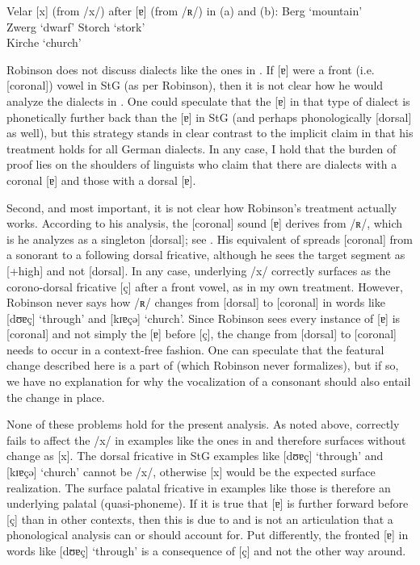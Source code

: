 \ea%
\label{ex:17:12}Velar [x] (from /x/) after [ɐ] (from /ʀ/) in  (a) and  (b):
\ea\relax [bɛːɐx]  \tab Berg    \tab ‘mountain’\\
   \relax [tvɛːɐx] \tab Zwerg   \tab  ‘dwarf’
\ex\relax [ʃtɔɐx]  \tab Storch  \tab  ‘stork’\\
   \relax [kiɐxŋ̩] \tab  Kirche \tab   ‘church’
    \z
\z 

Robinson does not discuss dialects like the ones in . If [ɐ] were a front (i.e. [coronal]) vowel in StG (as per Robinson), then it is not clear how he would analyze the dialects in . One could speculate that the [ɐ] in that type of dialect is phonetically further back than the [ɐ] in StG (and perhaps phonologically [dorsal] as well), but this strategy stands in clear contrast to the implicit claim in \citet{Robinson2001} that his treatment holds for all German dialects. In any case, I hold that the burden of proof lies on the shoulders of linguists who claim that there are dialects with a coronal [ɐ] and those with a dorsal [ɐ].

Second, and most important, it is not clear how Robinson’s treatment actually works. According to his analysis, the [coronal] sound [ɐ] derives from /ʀ/, which is he analyzes as a singleton [dorsal]; see \citet[113]{Robinson2001}. His equivalent of  spreads [coronal] from a sonorant to a following dorsal fricative, although he sees the target segment as [+high] and not [dorsal]. In any case, underlying /x/ correctly surfaces as the corono-dorsal fricative [ç] after a front vowel, as in my own treatment. However, Robinson never says how /ʀ/ changes from [dorsal] to [coronal] in words like [dʊɐç] ‘through’ and [kɪɐçə] ‘church’. Since Robinson sees every instance of [ɐ] is [coronal] and not simply the [ɐ] before [ç], the change from [dorsal] to [coronal] needs to occur in a context-free fashion. One can speculate that the featural change described here is a part of  (which Robinson never formalizes), but if so, we have no explanation for why the vocalization of a consonant should also entail the change in place.

None of these problems hold for the present analysis. As noted above,  correctly fails to affect the /x/ in examples like the ones in  and therefore surfaces without change as [x]. The dorsal fricative in StG examples like [dʊɐç] ‘through’ and [kɪɐçə] ‘church’ cannot be /x/, otherwise [x] would be the expected surface realization. The surface palatal fricative in examples like those is therefore an underlying palatal (quasi-phoneme). If it is true that [ɐ] is further forward before [ç] than in other contexts, then this is due to  and is not an articulation that a phonological analysis can or should account for. Put differently, the fronted [ɐ] in words like [dʊɐç] ‘through’ is a consequence of [ç] and not the other way around.

